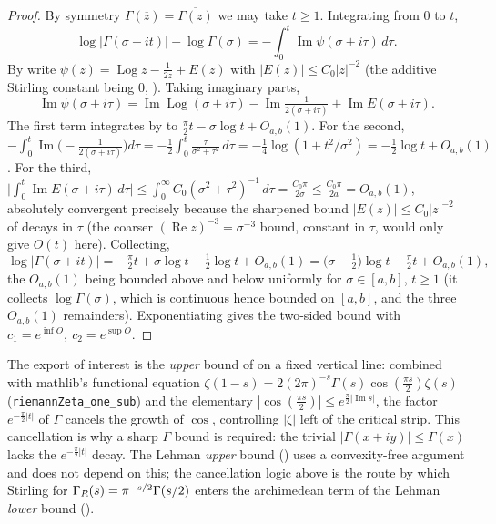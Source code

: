 \begin{proof}
\leanok
{}
By symmetry $\Gamma(\overline z)=\overline{\Gamma(z)}$ we may take $t\ge1$.
Integrating  from $0$ to $t$,
\[
  \log\bigl|\Gamma(\sigma+it)\bigr|-\log\Gamma(\sigma)
  = -\int_0^t \operatorname{Im}\psi(\sigma+i\tau)\,d\tau .
\]
By  write
$\psi(z)=\operatorname{Log}z-\tfrac1{2z}+E(z)$ with $|E(z)|\le C_0|z|^{-2}$ (the
additive Stirling constant being $0$, ). Taking imaginary parts,
\[
  \operatorname{Im}\psi(\sigma+i\tau)
  =\operatorname{Im}\operatorname{Log}(\sigma+i\tau)
   -\operatorname{Im}\tfrac1{2(\sigma+i\tau)}
   +\operatorname{Im}E(\sigma+i\tau).
\]
The first term integrates by  to
$\tfrac\pi2 t-\sigma\log t+O_{a,b}(1)$. For the second,
$-\int_0^t\operatorname{Im}\bigl(-\tfrac1{2(\sigma+i\tau)}\bigr)d\tau
=-\tfrac12\int_0^t\frac{\tau}{\sigma^2+\tau^2}\,d\tau
=-\tfrac14\log(1+t^2/\sigma^2)=-\tfrac12\log t+O_{a,b}(1)$. For the third,
$\bigl|\int_0^t\operatorname{Im}E(\sigma+i\tau)\,d\tau\bigr|
\le\int_0^\infty C_0(\sigma^2+\tau^2)^{-1}\,d\tau
=\tfrac{C_0\pi}{2\sigma}\le\tfrac{C_0\pi}{2a}=O_{a,b}(1)$, absolutely convergent
precisely because the sharpened bound $|E(z)|\le C_0|z|^{-2}$ of
 decays in $\tau$ (the coarser $(\operatorname{Re}
z)^{-3}=\sigma^{-3}$ bound, constant in $\tau$, would only give $O(t)$ here).
Collecting,
\[
  \log\bigl|\Gamma(\sigma+it)\bigr|
  = -\tfrac\pi2 t + \sigma\log t - \tfrac12\log t + O_{a,b}(1)
  = \bigl(\sigma-\tfrac12\bigr)\log t - \tfrac\pi2 t + O_{a,b}(1),
\]
the $O_{a,b}(1)$ being bounded above and below uniformly for $\sigma\in[a,b]$,
$t\ge1$ (it collects $\log\Gamma(\sigma)$, which is continuous hence bounded on
$[a,b]$, and the three $O_{a,b}(1)$ remainders). Exponentiating gives the two-sided
bound with $c_1=e^{\inf O},\ c_2=e^{\sup O}$.
\end{proof}

\begin{remark}
\label{rem:gs_chi}
The export of interest is the \emph{upper} bound of  on a
fixed vertical line: combined with mathlib's functional equation
$\zeta(1-s)=2(2\pi)^{-s}\Gamma(s)\cos(\tfrac{\pi s}2)\zeta(s)$
(\texttt{riemannZeta\_one\_sub}) and the elementary
$|\cos(\tfrac{\pi s}2)|\le e^{\frac\pi2|\operatorname{Im}s|}$, the factor
$e^{-\frac\pi2|t|}$ of $\Gamma$ cancels the growth of $\cos$, controlling
$|\zeta|$ left of the critical strip. This cancellation is why a sharp $\Gamma$
bound is required: the trivial $|\Gamma(x+iy)|\le\Gamma(x)$ lacks the
$e^{-\frac\pi2|t|}$ decay. The Lehman \emph{upper} bound () uses a
convexity-free argument and does not depend on this; the cancellation logic above is the
route by which Stirling for
$\Gamma_R(s)=\pi^{-s/2}\Gamma(s/2)$ enters the archimedean term of the Lehman
\emph{lower} bound ().
\end{remark}

